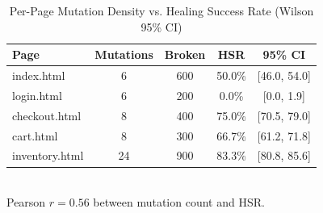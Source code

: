 \begin{table}[H]
\centering
\caption{Per-Page Mutation Density vs. Healing Success Rate (Wilson 95\% CI)}
\label{tab:mutation_density}
\begin{tabular}{lcccc}
\toprule
Page & Mutations & Broken & HSR & 95\% CI \\
\midrule
index.html & 6 & 600 & 50.0\% & [46.0, 54.0] \\
login.html & 6 & 200 & 0.0\% & [0.0, 1.9] \\
checkout.html & 8 & 400 & 75.0\% & [70.5, 79.0] \\
cart.html & 8 & 300 & 66.7\% & [61.2, 71.8] \\
inventory.html & 24 & 900 & 83.3\% & [80.8, 85.6] \\
\bottomrule
\end{tabular}
\vspace{2pt}\\\footnotesize Pearson $r=0.56$ between mutation count and HSR.
\end{table}